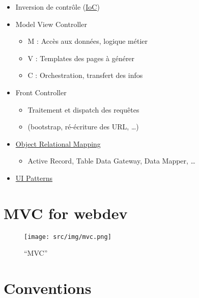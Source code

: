 \begin{itemize}
\tightlist
\item
  Inversion de contrôle
  (\href{http://martinfowler.com/bliki/InversionOfControl.html}{IoC})
\item
  Model View Controller

  \begin{itemize}
  \tightlist
  \item
    M : Accès aux données, logique métier
  \item
    V : Templates des pages à générer
  \item
    C : Orchestration, transfert des infos
  \end{itemize}
\item
  Front Controller

  \begin{itemize}
  \tightlist
  \item
    Traitement et dispatch des requêtes
  \item
    (bootstrap, ré-écriture des URL, \ldots{})
  \end{itemize}
\item
  \href{http://blog.mazenod.fr/2010/01/design-pattern-mvc-zoom-sur-la-couche-modele-dal-dao-orm-crud/}{Object
  Relational Mapping}

  \begin{itemize}
  \tightlist
  \item
    Active Record, Table Data Gateway, Data Mapper, \ldots{}
  \end{itemize}
\item
  \href{http://ui-patterns.com/}{UI Patterns}
\end{itemize}

\hypertarget{mvc-for-webdev}{%
\section{MVC for webdev}\label{mvc-for-webdev}}

\begin{figure}
\centering
\texttt{[image: src/img/mvc.png]}
\caption{``MVC''}
\end{figure}

\hypertarget{conventions}{%
\section{Conventions}\label{conventions}}

